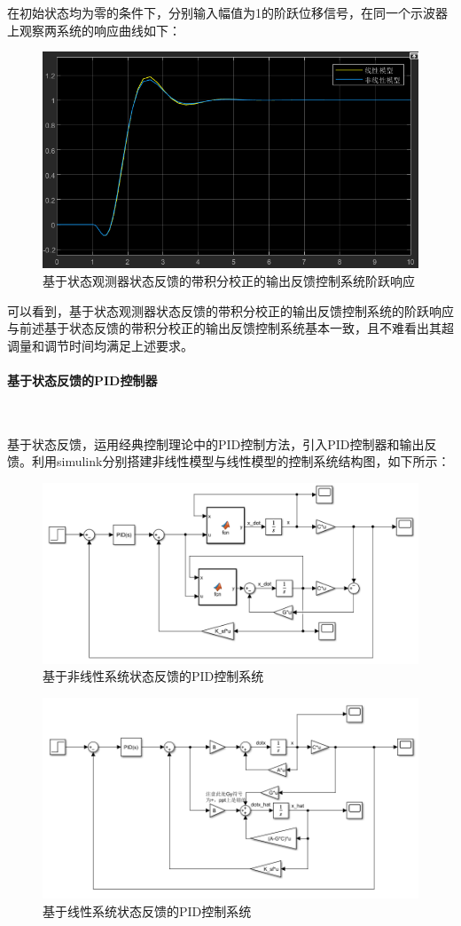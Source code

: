\documentclass[UTF8]{article}
\begin{document}
在初始状态均为零的条件下，分别输入幅值为1的阶跃位移信号，在同一个示波器上观察两系统的响应曲线如下：
\begin{figure}[H]
    \centering %
    \includegraphics[width=.6\textwidth]{figure/倒立摆-积分校正-状态反馈-阶跃响应.png}
    \caption{基于状态观测器状态反馈的带积分校正的输出反馈控制系统阶跃响应} %
\end{figure}
可以看到，基于状态观测器状态反馈的带积分校正的输出反馈控制系统的阶跃响应与前述基于状态反馈的带积分校正的输出反馈控制系统基本一致，且不难看出其超调量和调节时间均满足上述要求。

\paragraph{基于状态反馈的PID控制器}~{}

基于状态反馈，运用经典控制理论中的PID控制方法，引入PID控制器和输出反馈。利用simulink分别搭建非线性模型与线性模型的控制系统结构图，如下所示：
\begin{figure}[H]
    \centering %
    \includegraphics[width=.6\textwidth]{figure/倒立摆-非线性-pid-结构图.png}
    \caption{基于非线性系统状态反馈的PID控制系统} %
\end{figure}
\begin{figure}[H]
    \centering %
    \includegraphics[width=.6\textwidth]{figure/倒立摆-线性-pid-结构图.png}
    \caption{基于线性系统状态反馈的PID控制系统} %
\end{figure}
\end{document}
